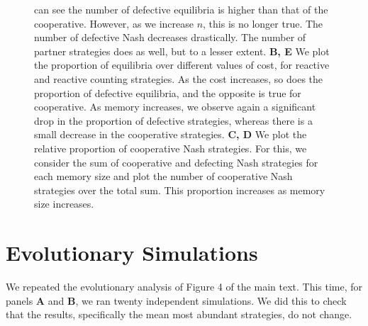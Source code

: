 \documentclass[11pt]{article}
\theoremstyle{plainCl1}
\theoremstyle{plainCl2}
\begin{document}
\begin{figure}[h]
{can see the number of defective equilibria is higher than that of the
cooperative. However, as we increase \(n\), this is no longer true. The number
of defective Nash decreases drastically. The number of partner strategies does
as well, but to a lesser extent.
{\bf B, E} We plot the proportion of equilibria over different values of cost, for reactive
and reactive counting strategies. As the cost increases, so does the
proportion of defective equilibria, and the opposite is true for cooperative. As
memory increases, we observe again a significant drop in the proportion of
defective strategies, whereas there is a small decrease in the cooperative
strategies. 
{\bf C, D} We plot the relative proportion of cooperative Nash strategies. For
this, we consider the sum of cooperative and defecting Nash strategies for each
memory size and plot the number of cooperative Nash strategies over the total
sum. This proportion increases as memory size increases.
}\label{fig:siFigDefectiveCooperativeNash}
\end{figure}



\newpage
\section{Evolutionary Simulations}

We repeated the evolutionary analysis of Figure 4 of the main text. This time,
for panels \textbf{A} and \textbf{B}, we ran twenty independent simulations. We
did this to check that the results, specifically the mean most abundant
strategies, do not change.
\end{document}
